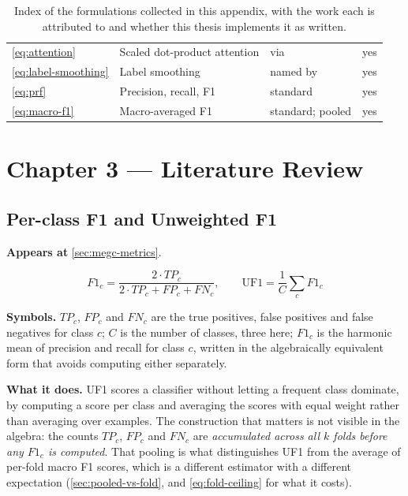 \begin{table}[htbp]
\begin{tabular}{@{}l l l l@{}}
		\autoref{eq:attention}     & Scaled dot-product attention  & via \cite{dosovitskiy2021}            & yes \\
		\autoref{eq:label-smoothing} & Label smoothing             & named by \cite{dosovitskiy2021}       & yes \\
		\autoref{eq:prf}           & Precision, recall, F1         & standard                              & yes \\
		\autoref{eq:macro-f1}      & Macro-averaged F1             & standard; \cite{see2019} pooled       & yes \\
		\hline
	\end{tabular}
	\caption[Index of formulations]{Index of the formulations collected in this
	appendix, with the work each is attributed to and whether this thesis
	implements it as written.}
	\label{tab:formula-index}
\end{table}


\section{Chapter 3 --- Literature Review}
\label{sec:eq-ch3}

\subsection{Per-class F1 and Unweighted F1}
\label{eq:uf1}

\textbf{Appears at} \autoref{sec:megc-metrics}.

\[
	F1_c = \frac{2 \cdot TP_c}{2 \cdot TP_c + FP_c + FN_c}, \qquad \text{UF1} = \frac{1}{C}\sum_c F1_c
\]

\textbf{Symbols.} $TP_c$, $FP_c$ and $FN_c$ are the true positives, false
positives and false negatives for class $c$; $C$ is the number of classes,
three here; $F1_c$ is the harmonic mean of precision and recall for class $c$,
written in the algebraically equivalent form that avoids computing either
separately.

\textbf{What it does.} UF1 scores a classifier without letting a frequent
class dominate, by computing a score per class and averaging the scores with
equal weight rather than averaging over examples. The construction that
matters is not visible in the algebra: the counts $TP_c$, $FP_c$ and $FN_c$
are \emph{accumulated across all $k$ folds before any $F1_c$ is computed}.
That pooling is what distinguishes UF1 from the average of per-fold macro F1
scores, which is a different estimator with a different expectation
(\autoref{sec:pooled-vs-fold}, and \autoref{eq:fold-ceiling} for what it costs).

